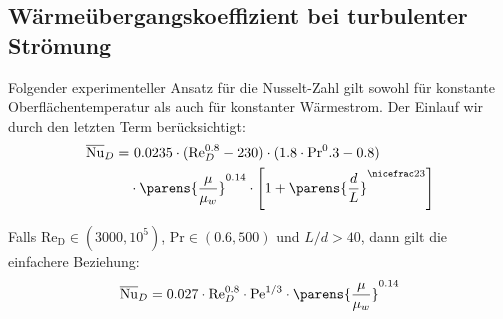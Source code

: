	\subsection{Wärmeübergangskoeffizient bei turbulenter Strömung} %
		Folgender experimenteller Ansatz für die Nusselt-Zahl gilt sowohl für konstante Oberflächentemperatur als auch für konstanter Wärmestrom. Der Einlauf wir durch den letzten Term berücksichtigt:
		\begin{align*}
			\overline{\mathrm{Nu}}_D =&\ 0.0235 \cdot ( \mathrm{Re}_D^{0.8} - 230 ) \cdot ( 1.8 \cdot \mathrm{Pr}^0.3 - 0.8 ) \\
			& \cdot \parens{\frac{\mu}{\mu_w}}^{0.14} \cdot \left[
				1 + \parens{\frac d L}^{\nicefrac 2 3}
			\right]
		\end{align*}

		Falls $\mathrm{Re_D} \in (3000,10^5)$, $\mathrm{Pr} \in (0.6, 500)$ und $L/d > 40$, dann gilt die einfachere Beziehung:
		\[
			\overline{\mathrm{Nu}}_D = 0.027 \cdot \mathrm{Re}_D^{0.8} \cdot \mathrm{Pe}^{1/3} \cdot \parens{\frac{\mu}{\mu_w}}^{0.14}
		\]
